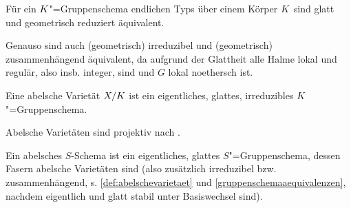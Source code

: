 \documentclass[german]{scrreprt}
\begin{document}
\begin{Definition}[$S$"=Gruppenschema]
  \begin{Bemerkung}\label{gruppenschemaaequivalenzen}
    Für ein $K$"=Gruppenschema endlichen Typs über einem Körper $K$
    sind glatt und geometrisch reduziert äquivalent.
    
    Genauso sind auch (geometrisch) irreduzibel und (geometrisch)
    zusammenhängend äquivalent, da aufgrund der Glattheit alle Halme
    lokal und regulär, also insb. integer, sind und $G$ lokal noethersch
    ist.
  \end{Bemerkung}
\end{Definition}
\begin{Definition}\label{def:abelschevarietaet}
  Eine abelsche Varietät $X/K$ ist ein eigentliches, glattes,
  irreduzibles $K$"=Gruppenschema.


  \begin{Bemerkung}\label{thm:abvarietaetprojektiv}
    Abelsche Varietäten sind projektiv nach
    \cite[9.6, Proposition 4]{bosch}.
  \end{Bemerkung}
\end{Definition}

\begin{Definition}
  Ein abelsches $S$-Schema ist ein eigentliches, glattes $S$"=Gruppenschema,
  dessen Fasern abelsche Varietäten sind 
  (also zusätzlich irreduzibel bzw. zusammenhängend,
  s. \ref{def:abelschevarietaet} und \ref{gruppenschemaaequivalenzen},
  nachdem eigentlich und glatt stabil unter Basiswechsel sind).
\end{Definition}
\end{document}
